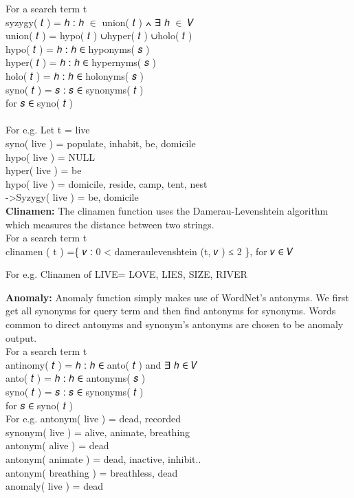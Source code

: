 \documentclass[conference]{IEEEtran}
\begin{document}
For a search term t\\
syzygy( 𝑡 ) ={ ℎ ∶ ℎ $\in$ union( 𝑡 ) ∧ ∃ ℎ $\in$ 𝑉 }      \\    
union( 𝑡 ) = hypo( 𝑡 ) ∪hyper( 𝑡 ) ∪holo( 𝑡 )         \\
hypo( 𝑡 ) = { ℎ ∶ ℎ ∈ hyponyms( 𝑠 ) }    \\
hyper( 𝑡 ) = { ℎ ∶ ℎ ∈ hypernyms( 𝑠 ) }    \\
holo( 𝑡 ) = { ℎ ∶ ℎ ∈ holonyms( 𝑠 ) }    \\
syno( 𝑡 ) = { 𝑠 ∶ 𝑠 ∈ synonyms( 𝑡 ) }      \\    
for 𝑠 ∈ syno( 𝑡 ) \\\\
For e.g. Let t = { live } \\
syno( live ) = { populate, inhabit, be, domicile }\\
hypo( live ) = { NULL }\\
hyper( live ) = { be }\\
hypo( live ) = { domicile, reside, camp, tent, nest }\\
->Syzygy( live ) = { be, domicile}\\

\textbf{Clinamen: }
The clinamen function uses the Damerau-Levenshtein algorithm  which measures the distance between two strings.\\
For a search term t  \\
clinamen ( t ) =\{ 𝑣 ∶ 0 < dameraulevenshtein (t, 𝑣   ) ≤ 2 \}, for 𝑣  ∈  𝑉

For e.g. Clinamen of LIVE= LOVE, LIES, SIZE, RIVER

\textbf{Anomaly:}
Anomaly function simply makes use of WordNet’s antonyms. We first get all synonyms for query term   and then find antonyms for synonyms. Words common to direct antonyms and synonym's antonyms are chosen to be anomaly output.\\

For a search term t \\
antinomy( 𝑡 ) = { ℎ ∶ ℎ ∈ anto( 𝑡 ) and ∃ ℎ ∈ 𝑉 }   \\
anto( 𝑡 ) = { ℎ ∶ ℎ ∈ antonyms( 𝑠 ) }           \\
syno( 𝑡 ) = { 𝑠 ∶ 𝑠 ∈ synonyms( 𝑡 ) }           \\
for 𝑠 ∈ syno( 𝑡 )\\

For e.g. antonym( live ) = { dead, recorded } \\
synonym( live ) = { alive, animate, breathing} \\
antonym( alive ) = {dead}\\
antonym( animate ) = { dead, inactive, inhibit..}  \\
antonym( breathing ) = { breathless, dead }\\
anomaly( live ) = {dead}\\
\end{document}
